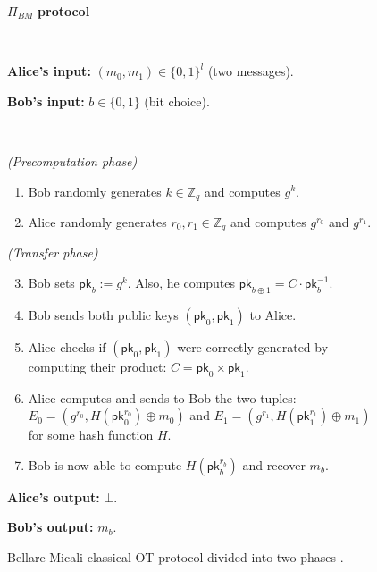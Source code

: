 \begin{figure}[h!]
\centering
\begin{tcolorbox}
                        
    \centerline{$\Pi_{BM}$ \textbf{protocol}}
            
    \
    
    \textbf{Alice's input:} $(m_0, m_1)\in\{0,1\}^l$ (two messages). 
    
    \textbf{Bob's input:} $b\in\{0,1\}$ (bit choice).
    
    \
    
    \textit{(Precomputation phase)}
    \begin{enumerate}
         \item Bob randomly generates $k\in \mathbb{Z}_q$ and computes $g^k$.
         \item Alice randomly generates $r_0, r_1\in \mathbb{Z}_q$ and computes $g^{r_0}$ and $g^{r_1}$.
    \end{enumerate}
    \textit{(Transfer phase)}
    \begin{enumerate}
    \setcounter{enumi}{2}
        \item Bob sets $\mathsf{pk}_b := g^k$. Also, he computes $\mathsf{pk}_{b\oplus 1} = C \cdot \mathsf{pk}_b^{-1}$.
        \item Bob sends both public keys $(\mathsf{pk}_0, \mathsf{pk}_1)$ to Alice.
        \item Alice checks if $(\mathsf{pk}_0, \mathsf{pk}_1)$ were correctly generated by computing their product: $C = \mathsf{pk}_0 \times \mathsf{pk}_1$.
        \item Alice computes and sends to Bob the two tuples: $E_0 = ( g^{r_0}, H(\mathsf{pk}_0^{r_0})\oplus m_0 )$ and $E_1 = ( g^{r_1}, H(\mathsf{pk}_1^{r_1})\oplus m_1 )$ for some hash function $H$.
        \item Bob is now able to compute $H(\mathsf{pk}_b^{r_b})$ and recover $m_b$.
    \end{enumerate} 
    
    \textbf{Alice's output:} $\bot$.
    
    \textbf{Bob's output:} $m_b$.
    
\end{tcolorbox} 
	\caption{Bellare-Micali classical OT protocol divided into two phases \cite{BM89}.}
	\label{fig:BMOTProtocol}
\end{figure}

